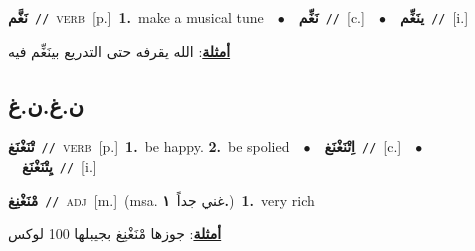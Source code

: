 \documentclass[10pt,a4paper,twoside]{article} %
\begin{document}
\begin{multicols}{2}
{\setlength\topsep{0pt}\textbf{\foreignlanguage{arabic}{نَغَّم}}\ {\color{gray}\texttt{//}\color{black}}\ \textsc{verb}\ [p.]\ \textbf{1.}~make a musical tune\ \ $\bullet$\ \ \setlength\topsep{0pt}\textbf{\foreignlanguage{arabic}{نَغِّم}}\ {\color{gray}\texttt{//}\color{black}}\ [c.]\ \ $\bullet$\ \ \setlength\topsep{0pt}\textbf{\foreignlanguage{arabic}{ينَغِّم}}\ {\color{gray}\texttt{//}\color{black}}\ [i.]\  \begin{flushright}\color{gray}\foreignlanguage{arabic}{\textbf{\underline{\foreignlanguage{arabic}{أمثلة}}}: الله يقرفه حتى التدريع بينَغِّم فيه}\end{flushright}\color{black}} \vspace{2mm}

\vspace{-3mm}
\subsection*{\color{blue}\foreignlanguage{arabic}{ن.غ.ن.غ}\color{blue}{}} 

{\setlength\topsep{0pt}\textbf{\foreignlanguage{arabic}{تْنَغْنَغ}}\ {\color{gray}\texttt{//}\color{black}}\ \textsc{verb}\ [p.]\ \textbf{1.}~be happy.  \textbf{2.}~be spolied\ \ $\bullet$\ \ \setlength\topsep{0pt}\textbf{\foreignlanguage{arabic}{اِتْنَغْنَغ}}\ {\color{gray}\texttt{//}\color{black}}\ [c.]\ \ $\bullet$\ \ \setlength\topsep{0pt}\textbf{\foreignlanguage{arabic}{يِتْنَغْنَغ}}\ {\color{gray}\texttt{//}\color{black}}\ [i.]\ } \vspace{2mm}

{\setlength\topsep{0pt}\textbf{\foreignlanguage{arabic}{مْنَغْنِغ}}\ {\color{gray}\texttt{//}\color{black}}\ \textsc{adj}\ [m.]\ \color{gray}(msa. \foreignlanguage{arabic}{غني جداً}~\foreignlanguage{arabic}{\textbf{١.}})\color{black}\ \textbf{1.}~very rich\  \begin{flushright}\color{gray}\foreignlanguage{arabic}{\textbf{\underline{\foreignlanguage{arabic}{أمثلة}}}: جوزها مْنَغْنِغ بجيبلها 100 لوكس}\end{flushright}\color{black}} \vspace{2mm}


\end{multicols}
\end{document}
